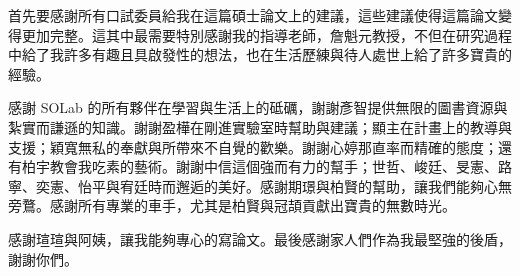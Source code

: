 首先要感謝所有口試委員給我在這篇碩士論文上的建議，這些建議使得這篇論文變得更加完整。這其中最需要特別感謝我的指導老師，詹魁元教授，不但在研究過程中給了我許多有趣且具啟發性的想法，也在生活歷練與待人處世上給了許多寶貴的經驗。

感謝 SOLab 的所有夥伴在學習與生活上的砥礪，謝謝彥智提供無限的圖書資源與紮實而謙遜的知識。謝謝盈樺在剛進實驗室時幫助與建議；顯主在計畫上的教導與支援；穎寬無私的奉獻與所帶來不自覺的歡樂。謝謝心婷那直率而精確的態度；還有柏宇教會我吃素的藝術。謝謝中信這個強而有力的幫手；世哲、峻廷、旻憲、路寧、奕憲、怡平與宥廷時而邂逅的美好。感謝期璟與柏賢的幫助，讓我們能夠心無旁鶩。感謝所有專業的車手，尤其是柏賢與冠頡貢獻出寶貴的無數時光。

感謝瑄瑄與阿姨，讓我能夠專心的寫論文。最後感謝家人們作為我最堅強的後盾，謝謝你們。


